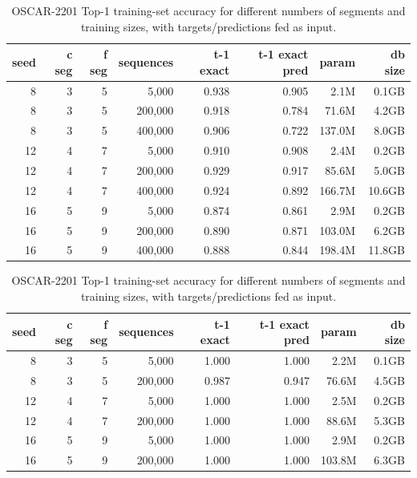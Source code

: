 \begin{table}[H]
\centering
\caption{OSCAR-2201 Top-1 training-set accuracy for different numbers of segments and training sizes, with targets/predictions fed as input.}
\label{tab:oscar-train-top1-accuracy}
\begin{tabular}{rrrrrrrr}
\toprule
\textbf{seed} & \textbf{c seg} & \textbf{f seg} & \textbf{sequences} & \textbf{t-1 exact} & \textbf{t-1 exact pred} & \textbf{param} & \textbf{db size} \\
\midrule
8 & 3 & 5 & 5,000    & 0.938 & 0.905 & 2.1M & 0.1GB \\
8 & 3 & 5 & 200,000  & 0.918 & 0.784 & 71.6M & 4.2GB \\
8 & 3 & 5 & 400,000  & 0.906 & 0.722 & 137.0M & 8.0GB \\
12 & 4 & 7 & 5,000   & 0.910 & 0.908 & 2.4M & 0.2GB \\
12 & 4 & 7 & 200,000 & 0.929 & 0.917 & 85.6M & 5.0GB \\
12 & 4 & 7 & 400,000 & 0.924 & 0.892 & 166.7M & 10.6GB \\
16 & 5 & 9 & 5,000   & 0.874 & 0.861 & 2.9M & 0.2GB \\
16 & 5 & 9 & 200,000 & 0.890 & 0.871 & 103.0M & 6.2GB \\
16 & 5 & 9 & 400,000 & 0.888 & 0.844 & 198.4M & 11.8GB \\
\bottomrule
\end{tabular}
\end{table}

\begin{table}[H]
\centering
\caption{OSCAR-2201 Top-1 training-set accuracy for different numbers of segments and training sizes, with targets/predictions fed as input.}
\label{tab:oscar-train-top1-accuracy-spacyPipelineOptimisations}
\begin{tabular}{rrrrrrrr}
\toprule
\textbf{seed} & \textbf{c seg} & \textbf{f seg} & \textbf{sequences} & \textbf{t-1 exact} & \textbf{t-1 exact pred} & \textbf{param} & \textbf{db size} \\
\midrule
8 & 3 & 5 & 5,000   & 1.000 & 1.000 & 2.2M & 0.1GB \\
8 & 3 & 5 & 200,000 & 0.987 & 0.947 & 76.6M & 4.5GB \\
12 & 4 & 7 & 5,000   & 1.000 & 1.000 & 2.5M & 0.2GB \\
12 & 4 & 7 & 200,000 & 1.000 & 1.000 & 88.6M & 5.3GB \\
16 & 5 & 9 & 5,000   & 1.000 & 1.000 & 2.9M & 0.2GB \\
16 & 5 & 9 & 200,000 & 1.000 & 1.000 & 103.8M & 6.3GB \\
\bottomrule
\end{tabular}
\end{table}


